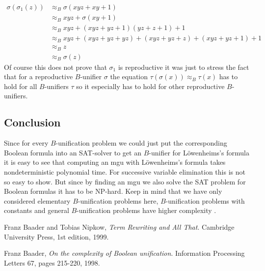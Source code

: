 	\begin{align*}
		\sigma(\sigma_1(z)) & \approx_B\sigma(xyz+xy+1)                        \\
		                    & \approx_Bxyz+\sigma(xy+1)                        \\
		                    & \approx_Bxyz+(xyz+yz+1)(yz+z+1)+1                \\
		                    & \approx_Bxyz+(xyz+yz+yz)+(xyz+yz+z)+(xyz+yz+1)+1 \\
		                    & \approx_Bz                                       \\
		                    & \approx_B\sigma(z)                               
	\end{align*}
	Of course this does not prove that $\sigma_1$ is reproductive it was just to stress the fact that for a reproductive $B$-unifier $\sigma$ the equation $\tau(\sigma(x))\approx_B\tau(x)$ has to hold for all $B$-unifiers $\tau$ so it especially has to hold for other reproductive $B$-unifiers.
	\subsection{Conclusion}
	Since for every $B$-unification problem we could just put the corresponding Boolean formula into an SAT-solver to get an $B$-unifier for Löwenheims's formula it is easy to see that computing an mgu with Löwenheims's formula takes nondeterministic polynomial time. For successive variable elimination this is not so easy to show. But since by finding an mgu we also solve the SAT problem for Boolean formulas it has to be NP-hard. Keep in mind that we have only considered elementary $B$-unification problems here, $B$-unification problems with constants and general $B$-unification problems have higher complexity \cite{cmplxBU}.
	\begin{thebibliography}{9}
				
		Franz Baader and Tobias Nipkow,
		\emph{Term Rewriting and All That}.
		Cambridge University Press,
		1st edition,
		1999.
				
		Franz Baader,
		\emph{On the complexity of Boolean unification}.
		Information Processing Letters 67,
		pages 215-220,
		1998.
				
	\end{thebibliography}